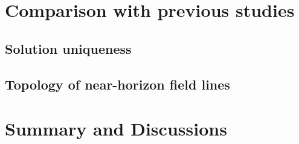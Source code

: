 \documentclass[aps,prd,reprint,nofootinbib, superscriptaddress]{revtex4-1}
\begin{document}
\section{Comparison with previous studies}

\subsection{Solution uniqueness}

\subsection{Topology of near-horizon field lines}

\section{Summary and Discussions}


\end{document}
